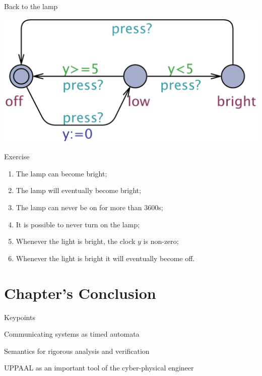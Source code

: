 \documentclass{beamer}
\begin{document}
\begin{frame}{Back to the lamp}

        \centering
        \includegraphics[scale=0.25]{./images/Lamp.pdf}

        \begin{block}{Exercise}
	\begin{enumerate}
                \item The lamp can become bright;
                \item The lamp will eventually become bright;
                \item The lamp can never be on for more than 3600s;
                \item It is possible to never turn on the lamp;
                \item Whenever the light is bright, the clock $y$
                        is non-zero;
                \item Whenever the light is bright it will eventually
                        become off.
	\end{enumerate}
        \end{block}
\end{frame}

\section{Chapter's Conclusion}

\begin{frame}{Keypoints}

        Communicating systems as  \alert{timed automata} 


        \vspace{0.5cm}
        \alert{Semantics} for rigorous analysis and verification

        \vspace{1cm}
        \alert{UPPAAL} as an important tool of the cyber-physical engineer
\end{frame}
\end{document}
